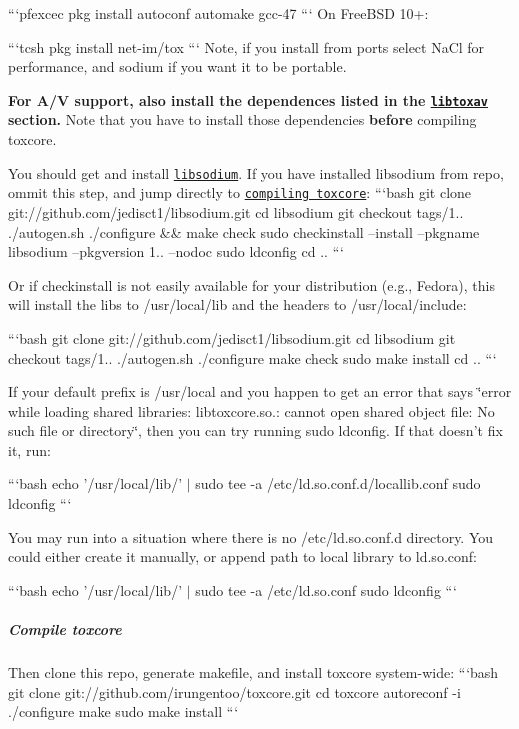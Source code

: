 ```pfexcec pkg install autoconf automake gcc-\/47 ``` On Free\+B\+S\+D 10+\+:

```tcsh pkg install net-\/im/tox ``` Note, if you install from ports select Na\+Cl for performance, and sodium if you want it to be portable.

{\bfseries For A/\+V support, also install the dependences listed in the \href{#libtoxav}{\tt libtoxav} section.} Note that you have to install those dependencies {\bfseries before} compiling {\ttfamily toxcore}.

You should get and install \href{https://github.com/jedisct1/libsodium}{\tt libsodium}. If you have installed {\ttfamily libsodium} from repo, ommit this step, and jump directly to \href{#compile-toxcore}{\tt compiling toxcore}\+: ```bash git clone git\+://github.com/jedisct1/libsodium.\+git cd libsodium git checkout tags/1.. ./autogen.sh ./configure \&\& make check sudo checkinstall --install --pkgname libsodium --pkgversion 1.. --nodoc sudo ldconfig cd .. ```

Or if checkinstall is not easily available for your distribution (e.\+g., Fedora), this will install the libs to /usr/local/lib and the headers to /usr/local/include\+:

```bash git clone git\+://github.com/jedisct1/libsodium.\+git cd libsodium git checkout tags/1.. ./autogen.sh ./configure make check sudo make install cd .. ```

If your default prefix is {\ttfamily /usr/local} and you happen to get an error that says {\ttfamily \char`\"{}error while loading shared libraries\+: libtoxcore.\+so.\+: cannot open shared object file\+: No such file or directory\char`\"{}}, then you can try running {\ttfamily sudo ldconfig}. If that doesn't fix it, run\+:

```bash echo '/usr/local/lib/' $\vert$ sudo tee -\/a /etc/ld.so.\+conf.\+d/locallib.conf sudo ldconfig ```

You may run into a situation where there is no {\ttfamily /etc/ld.so.\+conf.\+d} directory. You could either create it manually, or append path to local library to {\ttfamily ld.\+so.\+conf}\+:

```bash echo '/usr/local/lib/' $\vert$ sudo tee -\/a /etc/ld.so.\+conf sudo ldconfig ```

\subparagraph*{Compile toxcore}

Then clone this repo, generate makefile, and install {\ttfamily toxcore} system-\/wide\+: ```bash git clone git\+://github.com/irungentoo/toxcore.\+git cd toxcore autoreconf -\/i ./configure make sudo make install ```

